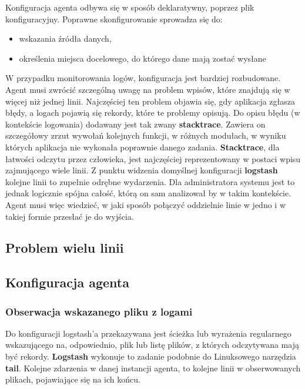     Konfiguracja agenta odbywa się w sposób deklaratywny, poprzez plik konfiguracyjny. Poprawne
    skonfigurowanie sprowadza się do:
    \begin{itemize}
        \item wskazania źródła danych,
        \item określenia miejsca docelowego, do którego dane mają zostać wysłane
    \end{itemize}
    W przypadku monitorowania logów, konfiguracja jest bardziej rozbudowane.
    Agent musi zwrócić szczególną uwagę na problem wpisów, które znajdują się w więcej niż jednej linii.
    Najczęściej ten problem objawia się, gdy aplikacja zgłasza błędy, a logach pojawią się rekordy, które
    te problemy opisują. Do opisu błędu (w kontekście logowania) dodawany jest tak zwany \textbf{stacktrace}.
    Zawiera on szczegółowy zrzut wywołań kolejnych funkcji, w różnych modułach, w wyniku których aplikacja
    nie wykonała poprawnie danego zadania. \textbf{Stacktrace}, dla łatwości odczytu przez człowieka,
    jest najczęściej reprezentowany w postaci wpisu zajmującego wiele linii. Z punktu widzenia domyślnej
    konfiguracji \textbf{logstash} kolejne linii to zupełnie odrębne wydarzenia. Dla administratora systemu jest
    to jednak logicznie spójna całość, którą on sam analizował by w takim kontekście. Agent musi więc wiedzieć,
    w jaki sposób połączyć oddzielnie linie w jedno i w takiej formie przesłać je do wyjścia.
    
    \subsection{Problem wielu linii}
    
    \subsection{Konfiguracja agenta}
        \label{chapter:monasca:monasca_log_agent:configuration}
        
        \subsubsection{Obserwacja wskazanego pliku z logami}
            Do konfiguracji logstash'a przekazywana jest ścieżka lub wyrażenia regularnego wskazującego
            na, odpowiednio, plik lub listę plików, z których odczytywana mają być rekordy. \textbf{Logstash}
            wykonuje to zadanie podobnie do Linuksowego narzędzia \textbf{tail}. Kolejne zdarzenia w danej 
            instancji agenta, to kolejne linii w obserwowanych plikach, pojawiające się na ich końcu. 
        
